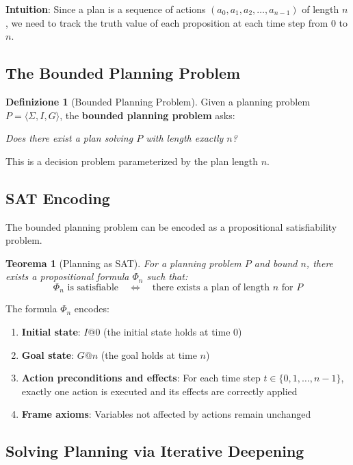 \documentclass[11pt,a4paper]{article}
\theoremstyle{definition}
\newtheorem{definition}{Definizione}[section]
\theoremstyle{plain}
\newtheorem{theorem}{Teorema}[section]
\theoremstyle{remark}
\begin{document}
\textbf{Intuition}: Since a plan is a sequence of actions $(a_0, a_1, a_2, \dots, a_{n-1})$ of length $n$, we need to track the truth value of each proposition at each time step from $0$ to $n$.

\subsection{The Bounded Planning Problem}

\begin{definition}[Bounded Planning Problem]
Given a planning problem $P = \langle \Sigma, I, G \rangle$, the \textbf{bounded planning problem} asks:

\textit{Does there exist a plan solving $P$ with length exactly $n$?}
\end{definition}

This is a decision problem parameterized by the plan length $n$.

\subsection{SAT Encoding}

The bounded planning problem can be encoded as a propositional satisfiability problem.

\begin{theorem}[Planning as SAT]
For a planning problem $P$ and bound $n$, there exists a propositional formula $\Phi_n$ such that:
\[
\Phi_n \text{ is satisfiable} \quad \Leftrightarrow \quad \text{there exists a plan of length } n \text{ for } P
\]
\end{theorem}

The formula $\Phi_n$ encodes:
\begin{enumerate}
    \item \textbf{Initial state}: $I@0$ (the initial state holds at time 0)
    \item \textbf{Goal state}: $G@n$ (the goal holds at time $n$)
    \item \textbf{Action preconditions and effects}: For each time step $t \in \{0, 1, \dots, n-1\}$, exactly one action is executed and its effects are correctly applied
    \item \textbf{Frame axioms}: Variables not affected by actions remain unchanged
\end{enumerate}

\subsection{Solving Planning via Iterative Deepening}
\end{document}
